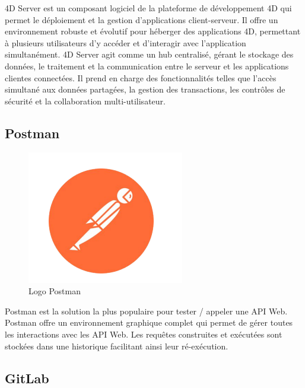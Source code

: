 4D Server est un composant logiciel de la plateforme de
développement 4D qui permet le déploiement et la gestion d’applications client-serveur. Il offre un environnement robuste et évolutif pour héberger des applications 4D, permettant à plusieurs utilisateurs d’y accéder et d’interagir avec
l’application simultanément. 4D Server agit comme un hub centralisé, gérant le stockage
des données, le traitement et la communication entre le serveur et les applications clientes
connectées. Il prend en charge des fonctionnalités telles que l’accès simultané aux données partagées, la gestion des transactions, les contrôles de sécurité et la collaboration
multi-utilisateur.

\subsection{Postman}

\begin{figure}[H]
    \centering
    \includegraphics[scale=0.5]{Logos/postman.png}
    \caption{Logo  Postman}
\end{figure}

Postman est la solution la plus populaire pour tester / appeler une API Web. Postman offre un environnement graphique complet qui permet de gérer toutes les interactions avec les API Web. Les requêtes construites et exécutées sont stockées dans une historique facilitant ainsi leur ré-exécution. \cite{Postman}

\subsection{GitLab}


